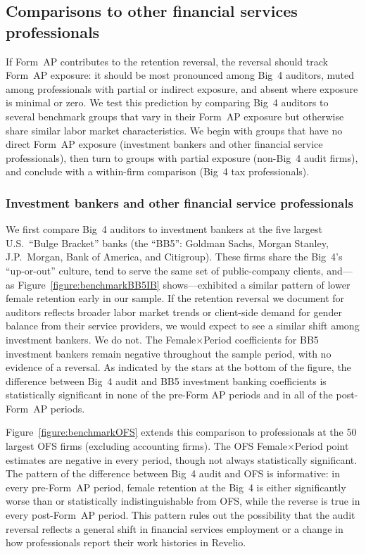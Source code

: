 \documentclass[11pt]{article}
\begin{document}
    \subsection{Comparisons to other financial services professionals}\label{section:benchmarks}

        If Form~AP contributes to the retention reversal, the reversal should track Form~AP exposure: it should be most pronounced among Big~4 auditors, muted among professionals with partial or indirect exposure, and absent where exposure is minimal or zero. We test this prediction by comparing Big~4 auditors to several benchmark groups that vary in their Form~AP exposure but otherwise share similar labor market characteristics. We begin with groups that have no direct Form~AP exposure (investment bankers and other financial service professionals), then turn to groups with partial exposure (non-Big~4 audit firms), and conclude with a within-firm comparison (Big~4 tax professionals).

        \subsubsection{Investment bankers and other financial service professionals}

            We first compare Big~4 auditors to investment bankers at the five largest U.S.\ ``Bulge Bracket'' banks (the ``BB5'': Goldman Sachs, Morgan Stanley, J.P.\ Morgan, Bank of America, and Citigroup). These firms share the Big~4's ``up-or-out'' culture, tend to serve the same set of public-company clients, and---as Figure~\ref{figure:benchmarkBB5IB} shows---exhibited a similar pattern of lower female retention early in our sample. If the retention reversal we document for auditors reflects broader labor market trends or client-side demand for gender balance from their service providers, we would expect to see a similar shift among investment bankers. We do not. The Female$\times$Period coefficients for BB5 investment bankers remain negative throughout the sample period, with no evidence of a reversal. As indicated by the stars at the bottom of the figure, the difference between Big~4 audit and BB5 investment banking coefficients is statistically significant in none of the pre-Form AP periods and in all of the post-Form~AP periods.

            Figure~\ref{figure:benchmarkOFS} extends this comparison to professionals at the 50 largest OFS firms (excluding accounting firms). The OFS Female$\times$Period point estimates are negative in every period, though not always statistically significant. The pattern of the difference between Big~4 audit and OFS is informative: in every pre-Form~AP period, female retention at the Big~4 is either significantly worse than or statistically indistinguishable from OFS, while the reverse is true in every post-Form~AP period. This pattern rules out the possibility that the audit reversal reflects a general shift in financial services employment or a change in how professionals report their work histories in Revelio.
\end{document}

